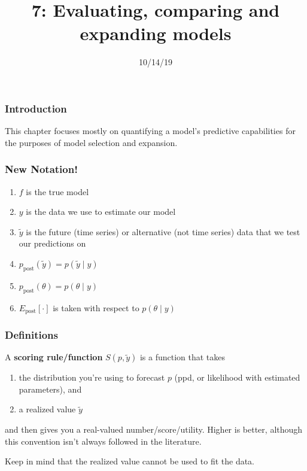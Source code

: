 \documentclass{beamer}
\title["7"]{7: Evaluating, comparing and expanding models}
\date{10/14/19}
\begin{document}

\begin{frame}
\titlepage 
\end{frame}

\begin{frame}
\frametitle{Introduction}

This chapter focuses mostly on quantifying a model's predictive capabilities for the purposes of model selection and expansion. 

\end{frame}

\begin{frame}
\frametitle{New Notation!}

\begin{enumerate}
\item $f$ is the true model 
\item $y$ is the data we use to estimate our model
\item $\tilde{y}$ is the future (time series) or alternative (not time series) data that we test our predictions on
\item $p_{\text{post}}(\tilde{y}) = p(\tilde{y} \mid y )$
\item $p_{\text{post}}(\theta) = p(\theta \mid y)$
\item $E_{\text{post}}[ \cdot ] $ is taken with respect to $p(\theta \mid y)$
\end{enumerate}


\end{frame}


\begin{frame}
\frametitle{Definitions}

A {\bf scoring rule/function} $S(p,\tilde{y})$ is a function that takes
\begin{enumerate}
\item the distribution you're using to forecast $p$ (ppd, or likelihood with estimated parameters), and 
\item a realized value $\tilde{y}$
\end{enumerate}
and then gives you a real-valued number/score/utility. Higher is better, although this convention isn't always followed in the literature.
\newline

Keep in mind that the realized value cannot be used to fit the data.
\end{frame}
\end{document}
